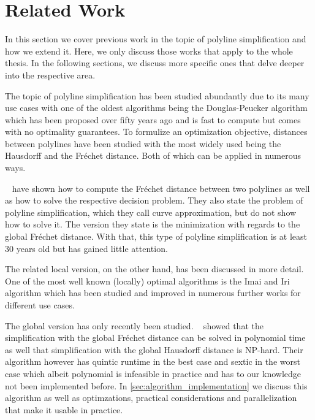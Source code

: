\section{Related Work}
\label{sec:related_work}

In this section we cover previous work in the topic of polyline simplification and how we extend it. Here, we only discuss those works that apply to the whole thesis. In the following sections, we discuss more specific ones that delve deeper into the respective area.

The topic of polyline simplification has been studied abundantly due to its many use cases with one of the oldest algorithms being the Douglas-Peucker algorithm \cite{algorithms_reduction_number_points_caricature} which has been proposed over fifty years ago and is fast to compute but comes with no optimality guarantees. To formulize an optimization objective, distances between polylines have been studied with the most widely used being the Hausdorff and the Fréchet distance. Both of which can be applied in numerous ways. 

\citeauthor{computing_the_frechet_distance_between_two_polygonal_curves}~\cite{computing_the_frechet_distance_between_two_polygonal_curves} have shown how to compute the Fréchet distance between two polylines as well as how to solve the respective decision problem. They also state the problem of polyline simplification, which they call curve approximation, but do not show how to solve it. The version they state is the minimization with regards to the global Fréchet distance. With that, this type of polyline simplification is at least 30 years old but has gained little attention.

The related local version, on the other hand, has been discussed in more detail. One of the most well known (locally) optimal algorithms is the Imai and Iri algorithm \cite{computational_geometric_methods_for_polygonal_approximations_of_a_curve} which has been studied and improved in numerous further works for different use cases. 

The global version has only recently been studied. \citeauthor{on_optimal_polyline_simplification_using_the_hausdorff_and_frechet_distance}~\cite{on_optimal_polyline_simplification_using_the_hausdorff_and_frechet_distance} showed that the simplification with the global Fréchet distance can be solved in polynomial time as well that simplification with the global Hausdorff distance is NP-hard. Their algorithm however has quintic runtime in the best case and sextic in the worst case which albeit polynomial is infeasible in practice and has to our knowledge not been implemented before. In \cref{sec:algorithm_implementation} we discuss this algorithm as well as optimzations, practical considerations and parallelization that make it usable in practice. 

